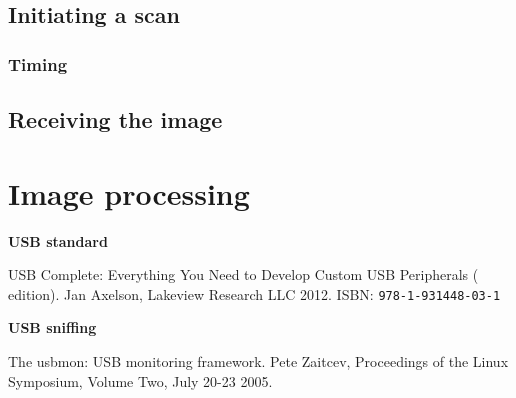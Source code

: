 \documentclass{article}
\begin{document}
\subsection{Initiating a scan}

\subsubsection{Timing}

\subsection{Receiving the image}

\section{Image processing}
\label{sec:imgproc}

\pagebreak

\renewcommand{\refname}{References}
\begin{thebibliography}{}

  \item[]\hspace{-\labelwidth}\hspace{-\labelsep}\textbf{USB standard}

   USB Complete: Everything You Need to Develop
               Custom USB Peripherals ( edition).
               Jan Axelson, Lakeview Research LLC 2012.
               ISBN: {\tt   978-1-931448-03-1}
               
  \item[]\hspace{-\labelwidth}\hspace{-\labelsep}\textbf{USB sniffing}
  
   The usbmon: USB monitoring framework. Pete Zaitcev,
  Proceedings of the Linux Symposium, Volume Two, July 20-23 2005.
  \setcounter{firstbib}{\value{enumiv}}
\end{thebibliography}
\end{document}
